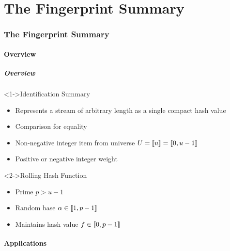 \part{The Fingerprint Summary}

\section{The Fingerprint Summary}

\subsection{Overview}

\begin{frame}
  \frametitle{Overview}

  \begin{block}<1->{Identification Summary}
    \begin{itemize}
      \item Represents a stream of arbitrary length as a single compact hash value
      \item Comparison for equality
      \item Non-negative integer item from universe \( U = \llbracket u\rrbracket = \llbracket0, u - 1\rrbracket \)
      \item Positive or negative integer weight
    \end{itemize}
  \end{block}

  \begin{block}<2->{Rolling Hash Function}
    \begin{itemize}
      \item Prime \( p > u - 1 \)
      \item Random base \( \alpha \in \llbracket1, p - 1\rrbracket \)
      \item Maintains hash value \( f \in \llbracket0, p - 1\rrbracket \)
    \end{itemize}
  \end{block}
\end{frame}

\subsection{Applications}

